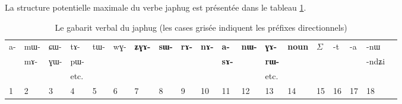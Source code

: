 \documentclass[oldfontcommands,oneside,a4paper,11pt]{article}
\newcommand{\ipab}[1]{{\scriptsize \phon#1}}
\newcommand{\grise}[1]{\cellcolor{lightgray}\textbf{#1}}
\begin{document}
La structure potentielle maximale du verbe japhug est présentée dans le tableau \ref{tab:gabarit}.


   \begin{landscape}
\begin{table}[h]
\caption{Le gabarit verbal du japhug (les cases grisée indiquent les préfixes directionnels)}\label{tab:gabarit}
\begin{tabular}{llllll|llllllll|lllll} \toprule
 
\ipab{a-}  &  	\ipab{mɯ- }   &  	\ipab{ɕɯ-}   &\ipab{tɤ-} &  	\ipab{tɯ-}  &  	\ipab{wɣ-}   &

  	 \grise{\ipab{ʑɣɤ-}}  &  	\grise{\ipab{sɯ-}}  & \grise{\ipab{rɤ-}}& \grise{\ipab{nɤ-}} &   	 \grise{\ipab{a-}}   &  	\grise{\ipab{nɯ-}}  &  	\grise{\ipab{ɣɤ-}}  &  	\grise{\ipab{noun}}    &  	 \begin{math}\Sigma\end{math}    &  	\ipab{-t}  &  	\ipab{-a}  &  	\ipab{-nɯ}   &  \\
   &  	\ipab{mɤ-}   &  	\ipab{ɣɯ-}   &\ipab{pɯ-}&  	  &  	 
    & \grise{ }	  &  	 \grise{ }	  &  	  \grise{ }	  &  	   \grise{ }	&  	\grise{\ipab{sɤ-}}&  \grise{ }	 &  	\grise{\ipab{rɯ-}}  &  	 \grise{ }	  &  	  &  	  &  	  &  	\ipab{-ndʑi} &  \\
  &  	   &     &  etc.	  & & 	  &  	  &  	 & &  	  &  	 & &  etc.	  &  	  &  	  &  	  &  	  &  	  &  \\
1  &  	2  &  	3  &  	4  &  	5  &  	6  &  	7  &  	8  &  	9  &  	10  &  	11  &  	12  &  	13  &  	14  &  	15  & 16 &17&18\\
\bottomrule
\end{tabular}
\end{table}
\begin{multicols}{2}
\begin{enumerate}



\end{enumerate}
\end{multicols}
\end{landscape}
\end{document}
